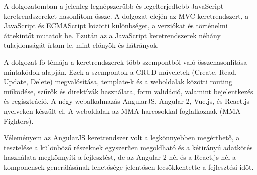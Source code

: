 
A dolgozatomban a jelenleg legnépszerűbb és legelterjedtebb JavaScript keretrendszereket hasonlítom össze. A dolgozat elején az MVC keretrendszert, a JavaScript és ECMAScript közötti különbséget, a verziókat és történelmi áttekintőt mutatok be. Ezután az a JavaScript keretrendszerek néhány tulajdonságát írtam le, mint előnyök és hátrányok.

A dolgozat fő témája a keretrendszerek több szempontból való összehasonlítása mintakódok alapján. Ezek a szempontok a CRUD műveletek (Create, Read, Update, Delete) megvalósítása, template-k és a weboldalak közötti routing működése, szűrők és direktívák használata, form validáció, valamint bejelentkezés és regisztráció. 
A négy webalkalmazás AngularJS, Angular 2, Vue.js, és React.js nyelveken készült el. A weboldalak az MMA harcosokkal foglalkoznak (MMA Fighters).

Véleményem az AngularJS keretrendszer volt a legkönnyebben megérthető, a tesztelése a különböző részeknek egyszerűen megoldható és a kétirányú adatkötés használata megkönnyíti a fejlesztést, de az Angular 2-nél és a React.js-nél a komponensek generálásának lehetősége jelentősen lecsökkentette a fejlesztési időt.
